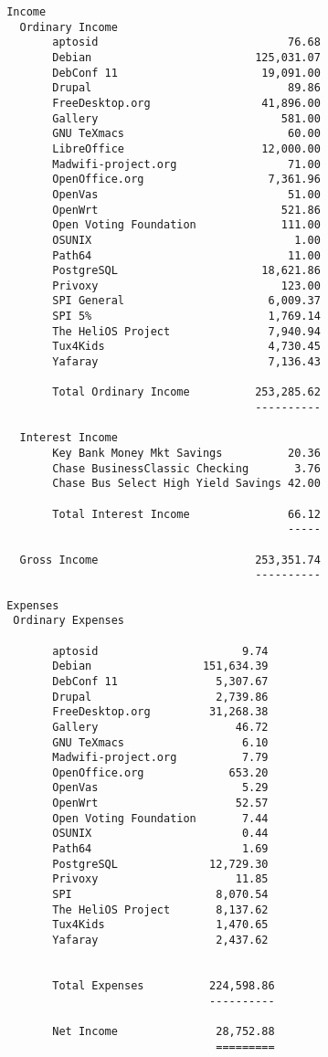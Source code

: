 \documentclass[letterpaper]{report}
\begin{document}
\begin{verbatim}
 Income
   Ordinary Income
        aptosid                             76.68
        Debian                         125,031.07
        DebConf 11                      19,091.00
        Drupal                              89.86
        FreeDesktop.org                 41,896.00
        Gallery                            581.00
        GNU TeXmacs                         60.00
        LibreOffice                     12,000.00
        Madwifi-project.org                 71.00
        OpenOffice.org                   7,361.96
        OpenVas                             51.00
        OpenWrt                            521.86
        Open Voting Foundation             111.00
        OSUNIX                               1.00
        Path64                              11.00
        PostgreSQL                      18,621.86
        Privoxy                            123.00
        SPI General                      6,009.37
        SPI 5%                           1,769.14
        The HeliOS Project               7,940.94
        Tux4Kids                         4,730.45
        Yafaray                          7,136.43

        Total Ordinary Income          253,285.62
                                       ----------

   Interest Income
        Key Bank Money Mkt Savings          20.36
        Chase BusinessClassic Checking       3.76
        Chase Bus Select High Yield Savings 42.00

        Total Interest Income               66.12
                                            -----

   Gross Income                        253,351.74
                                       ----------

 Expenses
  Ordinary Expenses

        aptosid                      9.74
        Debian                 151,634.39
        DebConf 11               5,307.67
        Drupal                   2,739.86
        FreeDesktop.org         31,268.38
        Gallery                     46.72
        GNU TeXmacs                  6.10
        Madwifi-project.org          7.79
        OpenOffice.org             653.20
        OpenVas                      5.29
        OpenWrt                     52.57
        Open Voting Foundation       7.44
        OSUNIX                       0.44
        Path64                       1.69
        PostgreSQL              12,729.30
        Privoxy                     11.85
        SPI                      8,070.54
        The HeliOS Project       8,137.62
        Tux4Kids                 1,470.65
        Yafaray                  2,437.62


        Total Expenses          224,598.86
                                ----------

        Net Income               28,752.88
                                 =========
\end{verbatim}
\end{document}
